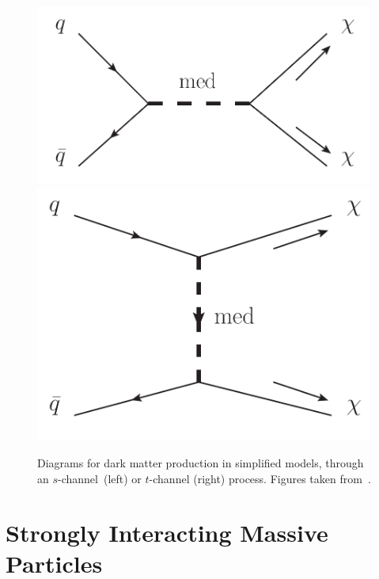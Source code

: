 \begin{figure}[ht]
  \centering
 \includegraphics[width=.45\textwidth]{schannel} \hspace{1.5cm}
 \includegraphics[width=.32\textwidth]{tchannel}
 \caption{Diagrams for dark matter production in simplified models, through an $s$-channel~(left) or $t$-channel (right) process. Figures taken from~\cite{Abdallah:2014hon}.}
 \label{fig:channel}
\end{figure}



\section{Strongly Interacting Massive Particles}
\label{sec:SIMP}

